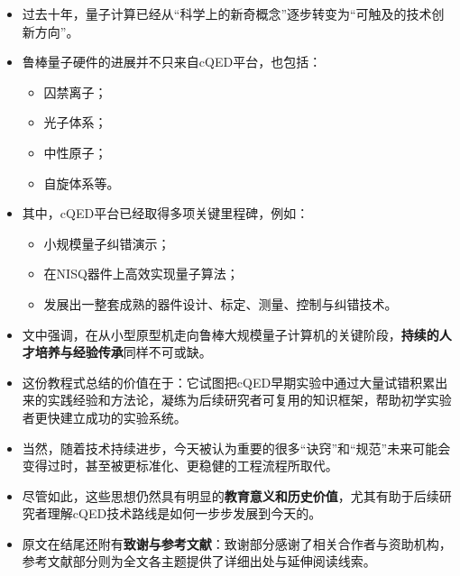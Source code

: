 \documentclass[12pt,a4paper,oneside]{ctexbook}
\begin{document}
\begin{itemize}
    \item 过去十年，量子计算已经从“科学上的新奇概念”逐步转变为“可触及的技术创新方向”。
    
    \item 鲁棒量子硬件的进展并不只来自cQED平台，也包括：
    \begin{itemize}
        \item 囚禁离子；
        \item 光子体系；
        \item 中性原子；
        \item 自旋体系等。
    \end{itemize}
    
    \item 其中，cQED平台已经取得多项关键里程碑，例如：
    \begin{itemize}
        \item 小规模量子纠错演示；
        \item 在NISQ器件上高效实现量子算法；
        \item 发展出一整套成熟的器件设计、标定、测量、控制与纠错技术。
    \end{itemize}
    
    \item 文中强调，在从小型原型机走向鲁棒大规模量子计算机的关键阶段，\textbf{持续的人才培养与经验传承}同样不可或缺。
    
    \item 这份教程式总结的价值在于：它试图把cQED早期实验中通过大量试错积累出来的实践经验和方法论，凝练为后续研究者可复用的知识框架，帮助初学实验者更快建立成功的实验系统。
    
    \item 当然，随着技术持续进步，今天被认为重要的很多“诀窍”和“规范”未来可能会变得过时，甚至被更标准化、更稳健的工程流程所取代。
    
    \item 尽管如此，这些思想仍然具有明显的\textbf{教育意义和历史价值}，尤其有助于后续研究者理解cQED技术路线是如何一步步发展到今天的。
    
    \item 原文在结尾还附有\textbf{致谢与参考文献}：致谢部分感谢了相关合作者与资助机构，参考文献部分则为全文各主题提供了详细出处与延伸阅读线索。
\end{itemize}
\end{document}
